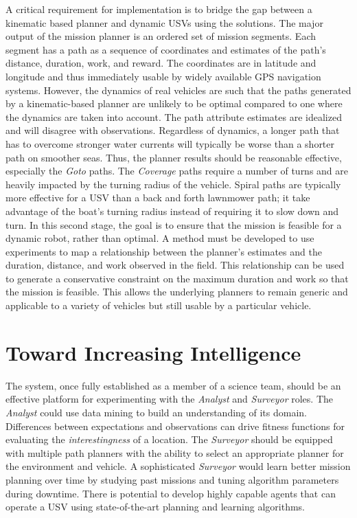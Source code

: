 \documentclass{tamuccthesis}
\begin{document}
A critical requirement for implementation is to bridge the gap between a kinematic based planner and dynamic USVs using the solutions. The major output of the mission planner is an ordered set of mission segments. Each segment has a path as a sequence of coordinates and estimates of the path's distance, duration, work, and reward. The coordinates are in latitude and longitude and thus immediately usable by widely available GPS navigation systems. However, the dynamics of real vehicles are such that the paths generated by a kinematic-based planner are unlikely to be optimal compared to one where the dynamics are taken into account. The path attribute estimates are idealized and will disagree with observations. Regardless of dynamics, a longer path that has to overcome stronger water currents will typically be worse than a shorter path on smoother seas. Thus, the planner results should be reasonable effective, especially the \textit{Goto} paths. The \textit{Coverage} paths require a number of turns and are heavily impacted by the turning radius of the vehicle. Spiral paths are typically more effective for a USV than a back and forth lawnmower path; it take advantage of the boat's turning radius instead of requiring it to slow down and turn. In this second stage, the goal is to ensure that the mission is feasible for a dynamic robot, rather than optimal. A method must be developed to use experiments to map a relationship between the planner's estimates and the duration, distance, and work observed in the field. This relationship can be used to generate a conservative constraint on the maximum duration and work so that the mission is feasible. This allows the underlying planners to remain generic and applicable to a variety of vehicles but still usable by a particular vehicle. 

\section{Toward Increasing Intelligence}

The system, once fully established as a member of a science team, should be an effective platform for experimenting with the \textit{Analyst} and \textit{Surveyor} roles. The \textit{Analyst} could use data mining to build an understanding of its domain. Differences between expectations and observations can drive fitness functions for evaluating the \textit{interestingness} of a location. The \textit{Surveyor} should be equipped with multiple path planners with the ability to select an appropriate planner for the environment and vehicle. A sophisticated \textit{Surveyor} would learn better mission planning over time by studying past missions and tuning algorithm parameters during downtime. There is potential to develop highly capable agents that can operate a USV using state-of-the-art planning and learning algorithms.
\end{document}

